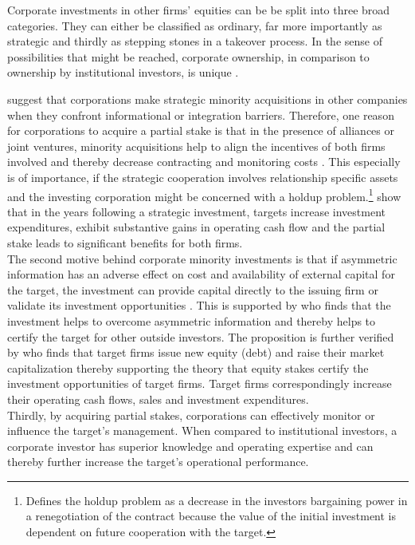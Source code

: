 \documentclass[12pt]{article}
\begin{document}
Corporate investments in other firms' equities can be be split into three broad categories. They can either be classified as ordinary, far more importantly as strategic and thirdly as stepping stones in a takeover process. 
In the sense of possibilities that might be reached, corporate ownership, in comparison to ownership by institutional investors, is unique \citep[p.2791]{Allen2000}.

\citet[p.1]{Huang2017} suggest that corporations make strategic minority acquisitions in other companies when they confront informational or integration barriers. 
Therefore, one reason for corporations to acquire a partial stake is that in the presence of alliances or joint ventures, minority acquisitions help to align the incentives of both firms involved and thereby decrease contracting and monitoring costs \citep[p.2792]{Allen2000}. This especially is of importance, if the strategic cooperation involves relationship specific assets and the investing corporation might be concerned with a holdup problem.\footnote{\citet[p.1023]{Ouimet2013} Defines the holdup problem as a decrease in the investors bargaining power in a renegotiation of the contract because the value of the initial investment is dependent on future cooperation with the target.} \citet[p. 2793]{Allen2000} show that in the years following a strategic investment,  targets increase investment expenditures, exhibit substantive gains in operating cash flow and the partial stake leads to significant benefits for both firms.\\
The second motive behind corporate minority investments is that if asymmetric information has an adverse effect on cost and availability of external capital for the target, the investment can provide capital directly to the issuing firm or validate its investment opportunities \citep[p. 2792]{Allen2000}. This is supported by \citet[p.1038]{Ouimet2013} who finds that the investment helps to overcome asymmetric information and thereby helps to certify the target for other outside investors. The proposition is further verified by \citet[p.78]{Liao2014} who finds that target firms issue new equity (debt) and raise their market capitalization thereby supporting the theory that equity stakes certify the investment opportunities of target firms. Target firms correspondingly increase their operating cash flows, sales and investment expenditures.\\ 
Thirdly, by acquiring partial stakes, corporations can effectively monitor or influence the target's management. When compared to institutional investors, a corporate investor has superior knowledge and operating expertise \citep[p.2792]{Allen2000} and can thereby further increase the target's operational performance.\\
\end{document}
